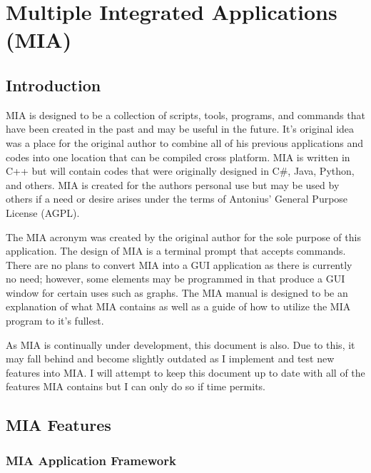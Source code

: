 \chapter{Multiple Integrated Applications (MIA)}
\pagestyle{fancy}

\section{Introduction}

MIA is designed to be a collection of scripts, tools, programs, and commands that have been created in the past and may be useful in the future. It's original idea was a place for the original author to combine all of his previous applications and codes into one location that can be compiled cross platform. MIA is written in C++ but will contain codes that were originally designed in C\#, Java, Python, and others. MIA is created for the authors personal use but may be used by others if a need or desire arises under the terms of Antonius’ General Purpose License (AGPL). 

The MIA acronym was created by the original author for the sole purpose of this application. The design of MIA is a terminal prompt that accepts commands. There are no plans to convert MIA into a GUI application as there is currently no need; however, some elements may be programmed in that produce a GUI window for certain uses such as graphs. The MIA manual is designed to be an explanation of what MIA contains as well as a guide of how to utilize the MIA program to it's fullest. 

As MIA is continually under development, this document is also. Due to this, it may fall behind and become slightly outdated as I implement and test new features into MIA. I will attempt to keep this document up to date with all of the features MIA contains but I can only do so if time permits.


















\section{MIA Features}

\subsection{MIA Application Framework}

